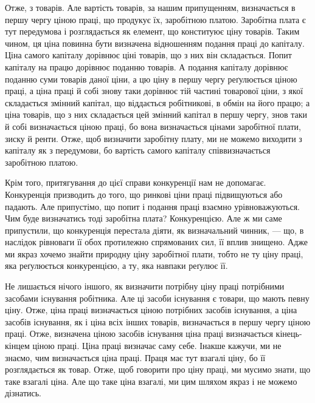 \parcont{}  %
Отже, з товарів. Але вартість товарів, за нашим припущенням, визначається
в першу чергу ціною праці, що продукує їх, заробітною платою. Заробітна плата
є тут передумова і розглядається як елемент, що конституює ціну товарів. Таким
чином, ця ціна повинна бути визначена відношенням подання праці до капіталу.
Ціна самого капіталу дорівнює ціні товарів, що з них він складається. Попит
капіталу на працю дорівнює поданню товарів. А подання капіталу дорівнює
поданню суми товарів даної ціни, а цю ціну в першу чергу реґулюється
ціною праці, а ціна праці й собі знову таки дорівнює тій частині товарової
ціни, з якої складається змінний капітал, що віддається робітникові, в
обмін на його працю; а ціна товарів, що з них складається цей змінний капітал
в першу чергу, знов таки й собі визначається ціною праці, бо вона визначається
цінами заробітної плати, зиску й ренти. Отже, щоб визначити заробітну плату,
ми не можемо виходити з капіталу як з передумови, бо вартість самого капіталу
співвизначається заробітною платою.

Крім того, притягування до цієї справи конкуренції нам не допомагає.
Конкуренція призводить до того, що ринкові ціни праці підвищуються
або падають. Але припустімо, що попит і подання праці взаємно урівноважуються.
Чим буде визначатись тоді заробітна плата? Конкуренцією. Але ж
ми саме припустили, що конкуренція перестала діяти, як визначальний чинник,
— що, в наслідок рівноваги її обох протилежно спрямованих сил, її вплив
знищено. Адже ми якраз хочемо знайти природну ціну заробітної плати,
тобто не ту ціну праці, яка реґулюється конкуренцією, а ту, яка навпаки
реґулює її.

Не лишається нічого іншого, як визначити потрібну ціну праці потрібними
засобами існування робітника. Але ці засоби існування є товари, що мають
певну ціну. Отже, ціна праці визначається ціною потрібних засобів існування,
а ціна засобів існування, як і ціна всіх інших товарів, визначається в першу
чергу ціною праці. Отже, визначена ціною засобів існування ціна праці визначається
кінець-кінцем ціною праці. Ціна праці визначає саму себе. Інакше кажучи,
ми не знаємо, чим визначається ціна праці. Праця має тут взагалі ціну,
бо її розглядається як товар. Отже, щоб говорити про ціну праці, ми мусимо
знати, що таке взагалі ціна. Але що таке ціна взагалі, ми цим шляхом якраз
і не можемо дізнатись.

